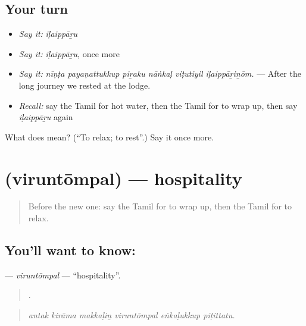 \subsection*{Your turn}
\begin{itemize}
\raggedright
  \item \emph{Say it:} \emph{iḷaippāṟu}
  \item \emph{Say it:} \emph{iḷaippāṟu}, once more
  \item \emph{Say it:} \emph{nīṇṭa payaṇattukkup piṟaku nāṅkaḷ viṭutiyil iḷaippāṟiṉōm.} — After the long journey we rested at the lodge.
  \item \emph{Recall:} say the Tamil for hot water, then the Tamil for to wrap up, then say \emph{iḷaippāṟu} again
\end{itemize}

\begin{tcolorbox}[breakable,colback=teal!4,colframe=teal!35!black,title={Before you move on}]
What does  mean? (\textquotedblleft{}To relax; to rest\textquotedblright{}.) Say it once more.
\end{tcolorbox}
\section[\texorpdfstring{\ta{விருந்தோம்பல்} (viruntōmpal)}{விருந்தோம்பல் (viruntōmpal)}]{ (viruntōmpal) — hospitality}

\label{lesson:TA-C419-viruntompal}



\begin{quote}
Before the new one: say the Tamil for to wrap up, then the Tamil for to relax.
\end{quote}

\subsection*{You'll want to know: }
\textbf{} — \emph{viruntōmpal} — \textquotedblleft{}hospitality\textquotedblright{}.

\begin{quote}
     .
\end{quote}

\begin{quote}
\emph{antak kirāma makkaḷiṉ viruntōmpal eṅkaḷukkup piṭittatu.}
\end{quote}

